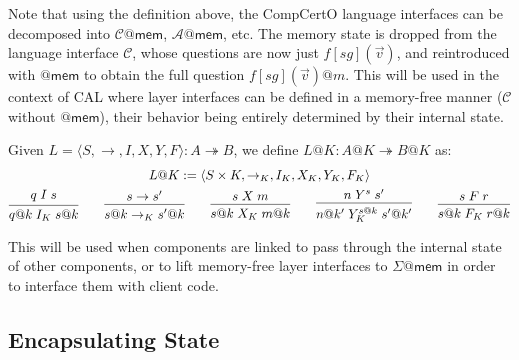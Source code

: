\documentclass[acmsmall,screen,review,anonymous]{acmart}
\newcommand{\kw}[1]{\ensuremath{ \mathsf{#1} }}
\begin{document}
Note that using the definition above,
the CompCertO language interfaces
can be decomposed into $\mathcal{C}@\kw{mem}$, $\mathcal{A}@\kw{mem}$, etc.
The memory state is dropped from the language interface $\mathcal{C}$,
whose questions are now just $f[\mathit{sg}](\vec{v})$,
and reintroduced with $@\kw{mem}$ to obtain
the full question $f[\mathit{sg}](\vec{v})@m$.
This will be used in the context of CAL
where layer interfaces can be defined in a memory-free manner
($\mathcal{C}$ without $@\kw{mem}$),
their behavior being entirely determined by their internal state.

\begin{definition}[Lifting]
Given %
$L = \langle S, {\rightarrow}, I, X, Y, F \rangle : A \twoheadrightarrow B$,
we define $L@K : A@K \twoheadrightarrow B@K$ as:
\begin{gather*}
  L@K := \langle S \times K, {\rightarrow_K}, I_K, X_K, Y_K, F_K \rangle \\
 {\begin{prooftree}
    \hypo{q \mathrel{I} s}
    \infer1{q@k \mathrel{I_K} s@k}
  \end{prooftree}}
  \qquad
 {\begin{prooftree}
    \hypo{s \rightarrow s'}
    \infer1{s@k \rightarrow_K s'@k}
  \end{prooftree}}
  \qquad
 {\begin{prooftree}
    \hypo{s \mathrel{X} m}
    \infer1{s@k \mathrel{X_K} m@k}
  \end{prooftree}}
  \qquad
 {\begin{prooftree}
    \hypo{n \mathrel{Y}^s s'}
    \infer1{n@k' \mathrel{Y^{s@k}_K} s'@k'}
  \end{prooftree}}
  \qquad
 {\begin{prooftree}
    \hypo{s \mathrel{F} r}
    \infer1{s@k \mathrel{F_K} r@k}
  \end{prooftree}}
\end{gather*}
\end{definition}

This will be used when components are linked
to pass through the internal state of other components,
or to lift memory-free layer interfaces to $\Sigma@\kw{mem}$
in order to interface them with client code.


\subsection{Encapsulating State} %
\end{document}

